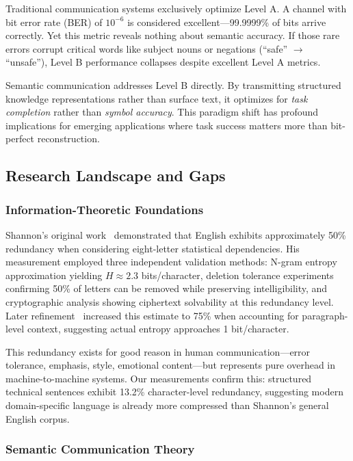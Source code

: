 \documentclass[conference]{IEEEtran}
\begin{document}
Traditional communication systems exclusively optimize Level A. A channel 
with bit error rate (BER) of $10^{-6}$ is considered excellent—99.9999\% 
of bits arrive correctly. Yet this metric reveals nothing about semantic 
accuracy. If those rare errors corrupt critical words like subject nouns 
or negations (``safe'' $\rightarrow$ ``unsafe''), Level B performance 
collapses despite excellent Level A metrics.

Semantic communication addresses Level B directly. By transmitting 
structured knowledge representations rather than surface text, it 
optimizes for \textit{task completion} rather than \textit{symbol accuracy}. 
This paradigm shift has profound implications for emerging applications 
where task success matters more than bit-perfect reconstruction.

\subsection{Research Landscape and Gaps}

\subsubsection{Information-Theoretic Foundations}

Shannon's original work~\cite{Shannon1948} demonstrated that English 
exhibits approximately 50\% redundancy when considering eight-letter 
statistical dependencies. His measurement employed three independent 
validation methods: N-gram entropy approximation yielding $H \approx 2.3$ 
bits/character, deletion tolerance experiments confirming 50\% of letters 
can be removed while preserving intelligibility, and cryptographic analysis 
showing ciphertext solvability at this redundancy level. Later refinement~\cite{Shannon1951} 
increased this estimate to 75\% when accounting for paragraph-level 
context, suggesting actual entropy approaches 1 bit/character.

This redundancy exists for good reason in human communication—error 
tolerance, emphasis, style, emotional content—but represents pure overhead 
in machine-to-machine systems. Our measurements confirm this: structured 
technical sentences exhibit 13.2\% character-level redundancy, suggesting 
modern domain-specific language is already more compressed than Shannon's 
general English corpus.

\subsubsection{Semantic Communication Theory}
\end{document}
